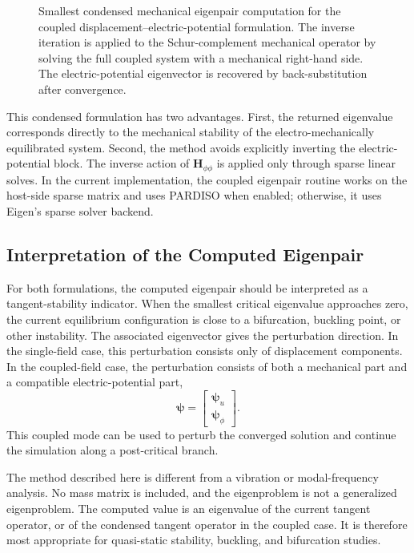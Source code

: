 \documentclass[11pt]{article}
\begin{document}
\begin{figure}[H]
\caption{Smallest condensed mechanical eigenpair computation for the coupled displacement--electric-potential formulation. The inverse iteration is applied to the Schur-complement mechanical operator by solving the full coupled system with a mechanical right-hand side. The electric-potential eigenvector is recovered by back-substitution after convergence.}
\label{fig:coupled_condensed_eigenpair}
\end{figure}
\FloatBarrier

This condensed formulation has two advantages. First, the returned eigenvalue corresponds directly to the mechanical stability of the electro-mechanically equilibrated system. Second, the method avoids explicitly inverting the electric-potential block. The inverse action of \(\mathbf{H}_{\phi\phi}\) is applied only through sparse linear solves. In the current implementation, the coupled eigenpair routine works on the host-side sparse matrix and uses PARDISO when enabled; otherwise, it uses Eigen's sparse solver backend.

\subsection{Interpretation of the Computed Eigenpair}

For both formulations, the computed eigenpair should be interpreted as a tangent-stability indicator. When the smallest critical eigenvalue approaches zero, the current equilibrium configuration is close to a bifurcation, buckling point, or other instability. The associated eigenvector gives the perturbation direction. In the single-field case, this perturbation consists only of displacement components. In the coupled-field case, the perturbation consists of both a mechanical part and a compatible electric-potential part,
\[
    \boldsymbol{\psi}
    =
    \begin{bmatrix}
    \boldsymbol{\psi}_{u}\\
    \boldsymbol{\psi}_{\phi}
    \end{bmatrix}.
\]
This coupled mode can be used to perturb the converged solution and continue the simulation along a post-critical branch.

The method described here is different from a vibration or modal-frequency analysis. No mass matrix is included, and the eigenproblem is not a generalized eigenproblem. The computed value is an eigenvalue of the current tangent operator, or of the condensed tangent operator in the coupled case. It is therefore most appropriate for quasi-static stability, buckling, and bifurcation studies.
\end{document}
